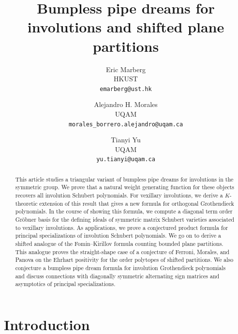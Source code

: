 \documentclass[10pt]{article}
\begin{document}
\title{Bumpless pipe dreams for involutions and shifted plane partitions}
\author{
    Eric Marberg
    \\
    HKUST \\
    {\tt emarberg@ust.hk}
    \and
    Alejandro H. Morales\\
    UQAM\\
    {\tt morales\_borrero.alejandro@uqam.ca}
    \and
    Tianyi Yu \\
    UQAM\\
    {\tt yu.tianyi@uqam.ca}
}


\date{}

 

\maketitle

\begin{abstract}
This article studies a triangular variant of bumpless pipe dreams for involutions in the symmetric group. We  
 prove that a natural weight generating function for these objects recovers all involution Schubert polynomials. For vexillary involutions, we derive a $K$-theoretic extension of this result that gives a new formula for orthogonal Grothendieck polynomials.
In the course of showing this formula, we compute a diagonal term order Gr\"obner basis
 for the defining ideals of symmetric matrix Schubert varieties associated to vexillary involutions.
As applications, we prove a conjectured product formula for principal specializations of involution Schubert polynomials. We go on to derive a shifted analogue of the Fomin--Kirillov formula counting bounded plane partitions. This analogue proves the straight-shape case of a  conjecture of Ferroni, Morales, and Panova on the Ehrhart positivity for the order polytopes of shifted partitions.  We also conjecture a  bumpless pipe dream formula for involution Grothendieck polynomials and discuss connections with diagonally symmetric alternating sign matrices and asymptotics of principal specializations.
\end{abstract}


 
\section{Introduction}
\end{document}
